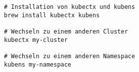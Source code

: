 \begin{verbatim}
# Installation von kubectx und kubens
brew install kubectx kubens

# Wechseln zu einem anderen Cluster
kubectx my-cluster

# Wechseln zu einem anderen Namespace
kubens my-namespace
\end{verbatim}